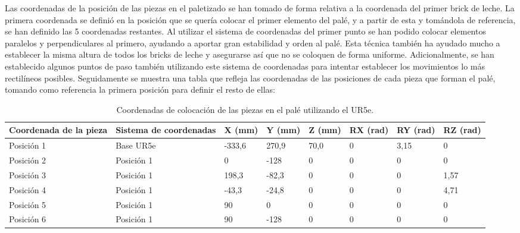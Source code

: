 Las coordenadas de la posición de las piezas en el paletizado se han tomado de forma relativa a la coordenada del primer brick de leche. La primera coordenada se definió en la posición que se quería colocar el primer elemento del palé, y a partir de esta y tomándola de referencia, se han definido las 5 coordenadas restantes. Al utilizar el sistema de coordenadas del primer punto se han podido colocar elementos paralelos y perpendiculares al primero, ayudando a aportar gran estabilidad y orden al palé. Esta técnica también ha ayudado mucho a establecer la misma altura de todos los bricks de leche y asegurarse así que no se coloquen de forma uniforme. Adicionalmente, se han establecido algunos puntos de paso también utilizando este sistema de coordenadas para intentar establecer los movimientos lo más rectilíneos posibles. Seguidamente se muestra una tabla que refleja las coordenadas de las posiciones de cada pieza que forman el palé, tomando como referencia la primera posición para definir el resto de ellas:

\begin{table}[H]
\begin{center}

\renewcommand{\arraystretch}{1.5}
\begin{tabular}{|M{2.45cm}|M{2.65cm}|M{1.2cm}|M{1.2cm}|M{1.2cm}|M{1.1cm}|M{1.1cm}|M{1.1cm}|}
\hline
\textbf{Coordenada de la pieza} &
\textbf{Sistema de coordenadas} & 
\textbf{X (mm)} & 
\textbf{Y (mm)} & 
\textbf{Z (mm)} &
\textbf{RX (rad)} &
\textbf{RY (rad)} &
\textbf{RZ (rad)} \\
\hline
Posición 1  & Base UR5e &  -333,6 & 270,9 & 70,0 & 0 & 3,15 & 0 \\
\hline
Posición 2  & Posición 1 &  0 & -128 & 0 & 0 & 0 & 0 \\
\hline
Posición 3  & Posición 1 &  198,3 & -82,3 & 0 & 0 & 0 & 1,57 \\
\hline
Posición 4  & Posición 1 &  -43,3 & -24,8 & 0 & 0 & 0 & 4,71 \\
\hline
Posición 5  & Posición 1 &  90 & 0 & 0 & 0 & 0 & 0 \\
\hline
Posición 6  & Posición 1 &  90 & -128 & 0 & 0 & 0 & 0 \\
\hline
\end{tabular}

\caption{\centering Coordenadas de colocación de las piezas en el palé utilizando el UR5e.}
\label{cuadro:coordenadas}
\end{center}
\end{table}

